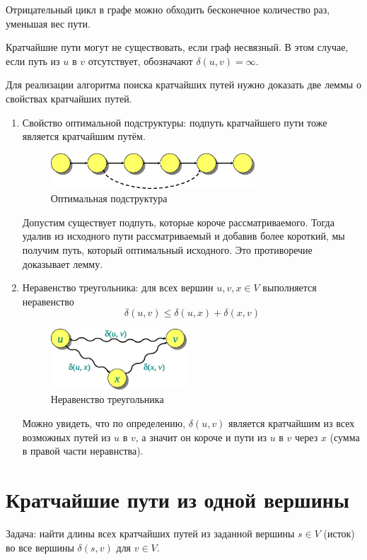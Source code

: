 \documentclass[11pt]{article}
\begin{document}
Отрицательный цикл в графе можно обходить бесконечное количество раз, уменьшая вес пути.

Кратчайшие пути могут не существовать, если граф несвязный. В этом случае, если путь из $u$ в $v$ отсутствует, обозначают $\delta(u, v) = \infty$.

Для реализации алгоритма поиска кратчайших путей нужно доказать две леммы о свойствах кратчайших путей.
\begin{enumerate}
\item Свойство оптимальной подструктуры: подпуть кратчайшего пути тоже является кратчайшим путём.
\begin{figure}[h!]
  \centering
  \includegraphics[width=3in]{lecture17/cutpaste.eps}
  \caption{Оптимальная подструктура}
\end{figure}

Допустим существует подпуть, которые короче рассматриваемого. Тогда удалив из исходного пути рассматриваемый и добавив более короткий, мы получим путь, который оптимальный исходного. Это противоречие доказывает лемму.
\item Неравенство треугольника: для всех вершин $u, v, x \in V$ выполняется неравенство
\begin{equation*}
  \delta(u, v) \leqslant \delta(u, x) + \delta(x, v)
\end{equation*}
\begin{figure}[h!]
  \centering
  \includegraphics[width=2in]{lecture17/triangle.eps}
  \caption{Неравенство треугольника}
\end{figure}
Можно увидеть, что по определению, $\delta(u, v)$ является кратчайшим из всех возможных путей из $u$ в $v$, а значит он короче и пути из $u$ в $v$ через $x$ (сумма в правой части неравнства).
\end{enumerate}

\section{Кратчайшие пути из одной вершины}
Задача: найти длины всех кратчайших путей из заданной вершины $s \in V$ (исток) во все вершины $\delta(s, v)$ для $v \in V$.
\end{document}
